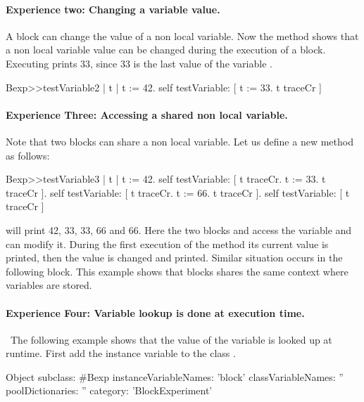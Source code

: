 \documentclass[a4paper,10pt,twoside]{book}
\begin{document}
\paragraph{Experience two: Changing a variable value.} A block can change the value of a non local variable.
Now the method  shows that a non local variable value can be changed during the execution of a block. Executing  prints 33, since 33 is the last value of the variable .


\begin{code}{}
Bexp>>testVariable2
	| t |
	t := 42.
	self testVariable: [ t := 33. t traceCr ]
\end{code}
\paragraph{Experience Three: Accessing a shared non local variable.}
Note that two blocks can share a non local variable. Let us define a new method  as follows:

\begin{code}{}
Bexp>>testVariable3
	| t |
	t := 42.
	self testVariable: [ t traceCr. t := 33. t traceCr ].
	self testVariable: [ t traceCr. t := 66. t traceCr ].
	self testVariable: [ t traceCr ]
\end{code}

 will print 42, 33, 33, 66 and 66.
Here the two blocks \ct{[ t := 33. t traceCr ]} and \ct{[ t := 66. t traceCr ]} access the variable  and can modify it. During the first execution of the method  its current value  is printed, then the value is changed and printed. Similar situation occurs in the following block. This example shows that blocks shares the same context where variables are stored.

\paragraph{Experience Four: Variable lookup is done at execution time.}\
The following example shows that the value of the variable is looked up at runtime.
First add the instance variable \ct{block} to the class \ct{Bexp}.

\begin{code}{}
Object subclass: #Bexp
	instanceVariableNames: 'block'
	classVariableNames: ''
	poolDictionaries: ''
	category: 'BlockExperiment'
\end{code}
\end{document}
